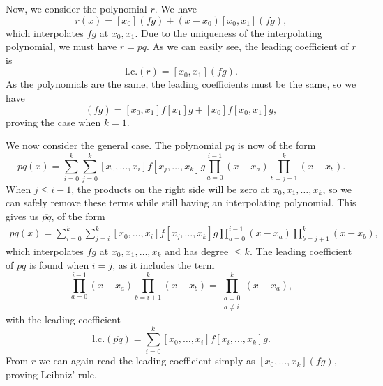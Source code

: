 \begin{solution}
    Now, we consider the polynomial $r$.
    We have
    \begin{equation*}
        r(x) = [x_0](fg) + (x - x_0)[x_0, x_1](fg),
    \end{equation*}
    which interpolates $fg$ at $x_0, x_1$.
    Due to the uniqueness of the interpolating polynomial, we must have $r = \overline{pq}$.
    As we can easily see, the leading coefficient of $r$ is
    \begin{equation*}
        \text{l.c.}(r) = [x_0, x_1](fg).
    \end{equation*}
    As the polynomials are the same, the leading coefficients must be the same, so we have
    \begin{equation*}
        [x_0, x_1](fg) = [x_0, x_1]f [x_1]g + [x_0]f [x_0, x_1]g,
    \end{equation*}
    proving the case when $k = 1$.

    We now consider the general case.
    The polynomial $pq$ is now of the form
    \begin{equation*}
        pq(x) = \sum_{i=0}^{k} \sum_{j=0}^{k} [x_0, \ldots, x_i]f [x_j, \ldots, x_k]g \prod_{a=0}^{i-1} (x - x_a) \prod_{b=j+1}^{k} (x - x_b).
    \end{equation*}
    When $j \leq i - 1$, the products on the right side will be zero at $x_0, x_1, \ldots, x_k$, so we can safely remove these terms while still having an interpolating polynomial.
    This gives us $\overline{pq}$, of the form
    \begin{align*}
        \overline{pq}(x) = \sum_{i=0}^{k} \sum_{j=i}^{k} [x_0, \ldots, x_i]f [x_j, \ldots, x_k]g \prod_{a=0}^{i-1} (x - x_a) \prod_{b=j+1}^{k} (x - x_b),
    \end{align*}
    which interpolates $fg$ at $x_0, x_1, \ldots, x_k$ and has degree $\leq k$.
    The leading coefficient of $\overline{pq}$ is found when $i = j$, as it includes the term
    \begin{equation*}
        \prod_{a=0}^{i-1} (x - x_a) \prod_{b=i+1}^{k} (x - x_b) = \prod_{\substack{a=0 \\ a \neq i}}^{k} (x - x_a),
    \end{equation*}
    with the leading coefficient
    \begin{equation*}
        \text{l.c.}(\overline{pq}) = \sum_{i = 0}^{k} [x_0, \ldots, x_i]f [x_i, \ldots, x_k]g.
    \end{equation*}
    From $r$ we can again read the leading coefficient simply as $[x_0, \ldots, x_k](fg)$, proving Leibniz' rule.
\end{solution}

